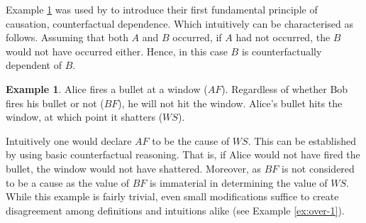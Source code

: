 \documentclass[11pt,a4paper]{book}
\theoremstyle{definition}
\theoremstyle{definition}
\newtheorem{example}{Example}[section]
\theoremstyle{definition}
\theoremstyle{remark}
\begin{document}
Example \ref{ex:basic-1} was used by \parencite{beckers2018principled} to introduce their first fundamental principle of causation, counterfactual dependence.
Which intuitively can be characterised as follows. Assuming that both $A$ and $B$ occurred, if $A$ had not occurred, the $B$ would not have occurred either. 
Hence, in this case $B$ is counterfactually dependent of $B$.

\begin{example}
\label{ex:basic-1}
Alice fires a bullet at a window ($AF$). Regardless of whether Bob fires his bullet or not ($BF$), he will not hit the window. Alice's bullet hits the window, at which point it shatters ($WS$).

\begin{center}
\end{center}


\end{example}

Intuitively one would declare $AF$ to be the cause of $WS$. This can be established by using basic counterfactual reasoning. That is, if Alice would not have fired the bullet, the window would not have shattered. 
Moreover, as $BF$ is not considered to be a cause as the value of $BF$ is immaterial in determining the value of $WS$.
While this example is fairly trivial, even small modifications suffice to create disagreement among definitions and intuitions alike (see Example \ref{ex:over-1}).
\end{document}
